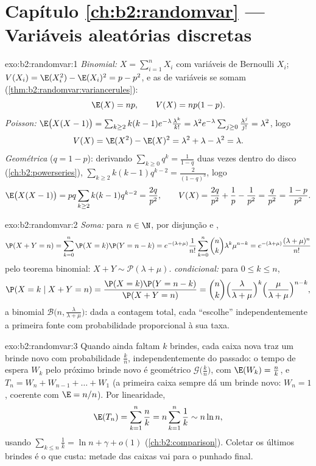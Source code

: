 \section*{Capítulo \ref{ch:b2:randomvar} --- Variáveis aleatórias discretas}

\begin{solution}{exo:b2:randomvar:1}
\emph{Binomial:} $X = \sum_{i=1}^n X_i$ com variáveis de Bernoulli 
$X_i$; $V(X_i) = \E(X_i^2) - \E(X_i)^2 = p - p^2$, e as 
de variáveis  se somam
(\cref{thm:b2:randomvar:variancerules}):
\[
\E(X) = np, \qquad V(X) = np(1-p) .
\]
\emph{Poisson:} $\E\bigl(X(X-1)\bigr) =
\sum_{k\geq2}k(k-1)e^{-\lambda}\frac{\lambda^k}{k!} = \lambda^2
e^{-\lambda}\sum_{j\geq0}\frac{\lambda^j}{j!} = \lambda^2$, logo
\[
V(X) = \E(X^2) - \E(X)^2
= \lambda^2 + \lambda - \lambda^2 = \lambda .
\]
\emph{Geométrica} ($q = 1 - p$): derivando
$\sum_{k\geq0}q^k = \frac{1}{1-q}$ duas vezes dentro do disco
(\cref{ch:b2:powerseries}), $\sum_{k\geq2}k(k-1)q^{k-2} =
\frac{2}{(1-q)^3}$, logo
\[
\E\bigl(X(X-1)\bigr) = pq\sum_{k\geq2}k(k-1)q^{k-2}
= \frac{2q}{p^2},
\qquad
V(X) = \frac{2q}{p^2} + \frac1p - \frac{1}{p^2}
= \frac{q}{p^2} = \frac{1-p}{p^2} .
\]
\end{solution}

\begin{solution}{exo:b2:randomvar:2}
\emph{Soma:} para $n \in \N$, por disjunção e ,
\[
\P(X + Y = n)
= \sum_{k=0}^n \P(X = k)\P(Y = n - k)
= e^{-(\lambda + \mu)}\frac{1}{n!}
\sum_{k=0}^n \binom nk \lambda^k\mu^{n-k}
= e^{-(\lambda+\mu)}\frac{(\lambda + \mu)^n}{n!}
\]
pelo teorema binomial: $X + Y \sim \mathcal{P}(\lambda + \mu)$.
\emph{ condicional:} para $0 \leq k \leq n$,
\[
\P(X = k \mid X + Y = n)
= \frac{\P(X = k)\P(Y = n - k)}{\P(X + Y = n)}
= \binom nk
\Bigl(\frac{\lambda}{\lambda+\mu}\Bigr)^{k}
\Bigl(\frac{\mu}{\lambda+\mu}\Bigr)^{n-k} ,
\]
a  binomial $\mathcal{B}\bigl(n,
\frac{\lambda}{\lambda+\mu}\bigr)$: dada a contagem total, cada
 ``escolhe'' independentemente a primeira fonte com probabilidade
proporcional à sua taxa.
\end{solution}

\begin{solution}{exo:b2:randomvar:3}
Quando ainda faltam $k$ brindes, cada caixa nova traz um brinde novo
com probabilidade $\frac kn$, independentemente do passado: o
tempo de espera $W_k$ pelo próximo brinde novo é geométrico
$\mathcal{G}\bigl(\frac kn\bigr)$, com $\E(W_k) = \frac nk$, e
$T_n = W_n + W_{n-1} + \dots + W_1$ (a primeira caixa sempre dá um brinde
novo: $W_n = 1$, coerente com $\E = n/n$). Por linearidade,
\[
\E(T_n) = \sum_{k=1}^n \frac nk = n\sum_{k=1}^n\frac1k
\sim n\ln n ,
\]
usando $\sum_{k\leq n}\frac1k = \ln n + \gamma + o(1)$
(\cref{ch:b2:comparison}). Coletar os últimos brindes é o que
custa: metade das caixas vai para o punhado final.
\end{solution}

